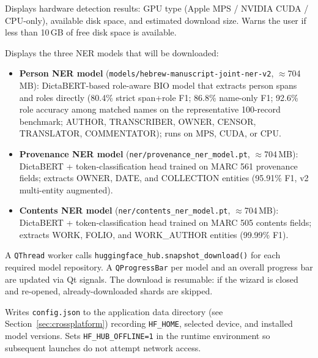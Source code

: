 \documentclass[12pt]{article}
\newcommand{\filepath}[1]{\texttt{\small #1}}
\newcommand{\code}[1]{\texttt{#1}}
\begin{document}
\begin{description}[style=nextline, leftmargin=2.5cm]
\item[Page 1 --- Welcome] Displays hardware detection results: GPU type (Apple MPS / NVIDIA CUDA / CPU-only), available disk space, and estimated download size. Warns the user if less than 10\,GB of free disk space is available.
\item[Page 2 --- Model Profile] Displays the three NER models that will be downloaded:
  \begin{itemize}
    \item \textbf{Person NER model} (\filepath{models/hebrew-manuscript-joint-ner-v2}, $\approx$704\,MB): DictaBERT-based role-aware BIO model that extracts person spans and roles directly (80.4\% strict span+role F1; 86.8\% name-only F1; 92.6\% role accuracy among matched names on the representative 100-record benchmark; AUTHOR, TRANSCRIBER, OWNER, CENSOR, TRANSLATOR, COMMENTATOR); runs on MPS, CUDA, or CPU.
    \item \textbf{Provenance NER model} (\filepath{ner/provenance\_ner\_model.pt}, $\approx$704\,MB): DictaBERT + token-classification head trained on MARC 561 provenance fields; extracts OWNER, DATE, and COLLECTION entities (95.91\% F1, v2 multi-entity augmented).
    \item \textbf{Contents NER model} (\filepath{ner/contents\_ner\_model.pt}, $\approx$704\,MB): DictaBERT + token-classification head trained on MARC 505 contents fields; extracts WORK, FOLIO, and WORK\_AUTHOR entities (99.99\% F1).
  \end{itemize}
\item[Page 3 --- Download] A \code{QThread} worker calls \code{huggingface\_hub.snapshot\_download()} for each required model repository. A \code{QProgressBar} per model and an overall progress bar are updated via Qt signals. The download is resumable: if the wizard is closed and re-opened, already-downloaded shards are skipped.
\item[Page 4 --- Complete] Writes \code{config.json} to the application data directory (see Section~\ref{sec:crossplatform}) recording \code{HF\_HOME}, selected device, and installed model versions. Sets \code{HF\_HUB\_OFFLINE=1} in the runtime environment so subsequent launches do not attempt network access.
\end{description}


\end{document}
